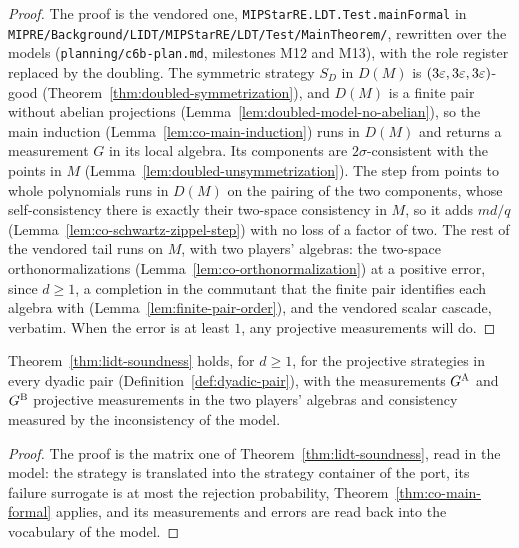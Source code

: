 \begin{proof}
\leanok
The proof is the vendored one, \texttt{MIPStarRE.LDT.Test.mainFormal} in
\texttt{MIPRE/Background/LIDT/MIPStarRE/LDT/Test/MainTheorem/}, rewritten over the models
(\texttt{planning/c6b-plan.md}, milestones M12 and M13), with the role register replaced by the
doubling. The symmetric strategy $S_D$ in $D(M)$ is $(3\varepsilon, 3\varepsilon, 3\varepsilon)$-good
(Theorem~\ref{thm:doubled-symmetrization}), and $D(M)$ is a finite pair without abelian
projections (Lemma~\ref{lem:doubled-model-no-abelian}), so the main induction
(Lemma~\ref{lem:co-main-induction}) runs in $D(M)$ and returns a measurement $G$ in its local
algebra. Its components are $2\sigma$-consistent with the points in $M$
(Lemma~\ref{lem:doubled-unsymmetrization}). The step from points to whole polynomials runs in
$D(M)$ on the pairing of the two components, whose self-consistency there is exactly their
two-space consistency in $M$, so it adds $md/q$ (Lemma~\ref{lem:co-schwartz-zippel-step}) with no
loss of a factor of two. The rest of the vendored tail runs on $M$, with two players' algebras: the
two-space orthonormalizations (Lemma~\ref{lem:co-orthonormalization}) at a positive error, since
$d \geq 1$, a completion in the commutant that the finite pair identifies each algebra with
(Lemma~\ref{lem:finite-pair-order}), and the vendored scalar cascade, verbatim. When the error is
at least $1$, any projective measurements will do.
\end{proof}

\begin{lemma}
\label{lem:co-lidt-canonical-line}
\leanok
Theorem~\ref{thm:lidt-soundness} holds, for $d \geq 1$, for the projective strategies in every
dyadic pair (Definition~\ref{def:dyadic-pair}), with the measurements $G^{\textsc{A}}$ and $G^{\textsc{B}}$
projective measurements in the two players' algebras and consistency measured by the
inconsistency of the model.
\end{lemma}

\begin{proof}
\leanok
The proof is the matrix one of Theorem~\ref{thm:lidt-soundness}, read in the model: the strategy
is translated into the strategy container of the port, its failure surrogate is at most the
rejection probability, Theorem~\ref{thm:co-main-formal} applies, and its measurements and errors
are read back into the vocabulary of the model.
\end{proof}

